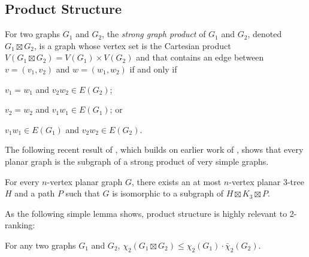 \documentclass[kpfonts]{patmorin}
\newcommand{\trn}{\chi_2}
\newcommand{\dtcn}{\bar{\chi}_2}
\theoremstyle{named}
\begin{document}
\subsection{Product Structure}

For two graphs $G_1$ and $G_2$, the \emph{strong graph product} of $G_1$ and $G_2$, denoted $G_1\boxtimes G_2$, is a graph whose vertex set is the Cartesian product $V(G_1\boxtimes G_2)= V(G_1)\times V(G_2)$ and that contains an edge between $v=(v_1,v_2)$ and $w=(w_1,w_2)$ if and only if
\begin{inparaenum}[(i)]
    \item $v_1=w_1$ and $v_2w_2\in E(G_2)$;
    \item $v_2=w_2$ and $v_1w_1\in E(G_1)$; or
    \item $v_1w_1\in E(G_1)$ and $v_2w_2\in E(G_2)$.
\end{inparaenum}

The following recent result of \citet{dujmovic.joret.ea:planar}, which builds on earlier work of \citet{pilipczuk.siebertz:polynomial}, shows that every planar graph is the subgraph of a strong product of very simple graphs.

\begin{thm}\cite{dujmovic.joret.ea:planar}\label{product-structure}
    For every $n$-vertex planar graph $G$, there exists an at most $n$-vertex planar 3-tree $H$ and a path $P$ such that $G$ is isomorphic to a subgraph of $H\boxtimes K_3\boxtimes P$.
\end{thm}

As the following simple lemma shows, product structure is highly relevant to 2-ranking:

\begin{lem}\label{product-lemma}
    For any two graphs $G_1$ and $G_2$, $\trn(G_1\boxtimes G_2)\le \trn(G_1)\cdot\dtcn(G_2)$.
\end{lem}
\end{document}
